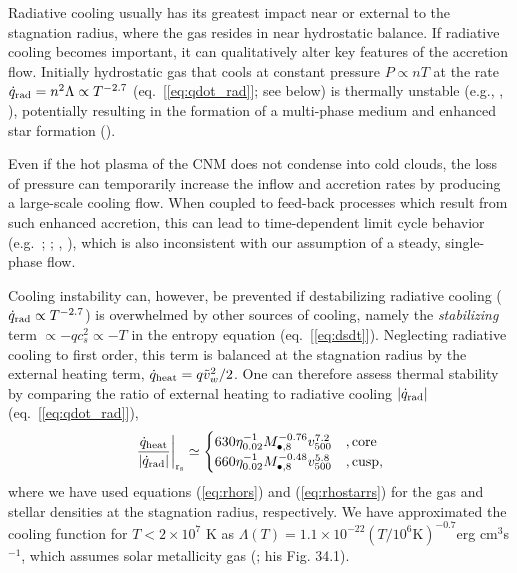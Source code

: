 \documentclass[usenatbib,fleqn]{mn2e}
\begin{document}
Radiative cooling usually has its greatest impact near or external to
the stagnation radius, where the gas resides in near hydrostatic
balance.  If radiative cooling becomes important, it can qualitatively
alter key features of the accretion flow. Initially hydrostatic gas
that cools at constant pressure $P \propto nT$ at the rate
$\dot{q}_{\rm rad} = n^{2}\Lambda \propto T^{-2.7}$
(eq.~[\ref{eq:qdot_rad}]; see below) is thermally unstable (e.g.,
\citealt{McCourt+12}, \citealt{Li&Bryan14a}), potentially resulting in
the formation of a multi-phase medium and enhanced star formation
(\citealt{Li&Bryan14b}).  

Even if the hot plasma of the CNM does not condense into cold clouds,
the loss of pressure can temporarily increase the inflow and accretion
rates by producing a large-scale cooling flow.  When coupled to
feed-back processes which result from such enhanced accretion, this
can lead to time-dependent limit cycle behavior
(e.g.~\citealt{Ciotti&Ostriker07}; \citealt{Ciotti+10};
\citealt{Yuan&Li11}, \citealt{Gan+14}), which is also inconsistent
with our assumption of a steady, single-phase flow.

Cooling instability can, however, be prevented if destabilizing
radiative cooling ($\dot{q}_{\rm rad} \propto T^{-2.7}$) is
overwhelmed by other sources of cooling, namely the {\it stabilizing}
term $\propto -q c_{s}^{2} \propto -T$ in the entropy equation
(eq.~[\ref{eq:dsdt}]).  Neglecting radiative cooling to first order,
this term is balanced at the stagnation radius by the external heating
term, $\dot{q}_{\rm heat} = q \tilde{v}_{w}^{2}/2$.  One can therefore assess thermal
stability by comparing the ratio of
external heating to radiative cooling $|\dot{q}_{\rm rad}|$
(eq.~[\ref{eq:qdot_rad}]),
\begin{align}
\left.\frac{\dot{q}_{\rm heat}}{|\dot{q}_{\rm rad}|}\right|_{\rm r_{\rm s}} \simeq
  \begin{cases}
   630 \eta_{0.02}^{-1} M_{\bullet,8}^{-0.76}v_{500}^{7.2}  &, \text{core}\\
   660 \eta_{0.02}^{-1} M_{\bullet,8}^{-0.48}v_{500}^{5.8}  &, \text{cusp},     
  \end{cases}
  \label{eq:cooling2}
\end{align}
where we have used equations (\ref{eq:rhors}) and (\ref{eq:rhostarrs})
for the gas and stellar densities at the stagnation radius,
respectively.  We have approximated the cooling function for $T <
2\times 10^{7}$ K as $\Lambda(T) = 1.1 \times 10^{-22} \left(T/10^6
  \text{K}\right)^{-0.7} $erg cm$^3 $s$^{-1}$, which assumes solar
metallicity gas (\citealt{Draine:2011a}; his Fig. 34.1).  
\end{document}
